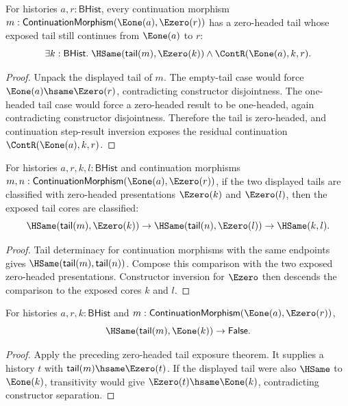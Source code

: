 \begin{theorem}
\label{thm:category-continuation-morphism-e1-source-e0-target-tail-cases}
For histories $a,r:\mathsf{BHist}$, every continuation morphism
$m:\mathsf{ContinuationMorphism}(\Eone(a),\Ezero(r))$ has a zero-headed tail
whose exposed tail still continues from $\Eone(a)$ to $r$:
$$
\exists k:\mathsf{BHist}.\;
\HSame(\mathsf{tail}(m),\Ezero(k))\land \ContR(\Eone(a),k,r).
$$
\end{theorem}
\begin{proof}
Unpack the displayed tail of $m$. The empty-tail case would force
$\Eone(a)\hsame\Ezero(r)$, contradicting constructor disjointness. The
one-headed tail case would force a zero-headed result to be one-headed, again
contradicting constructor disjointness. Therefore the tail is zero-headed, and
continuation step-result inversion exposes the residual continuation
$\ContR(\Eone(a),k,r)$.
\end{proof}

\begin{theorem}
\label{thm:continuation-morphism-e1-source-e0-target-tail-core-deterministic}
For histories $a,r,k,l:\mathsf{BHist}$ and continuation morphisms
$m,n:\mathsf{ContinuationMorphism}(\Eone(a),\Ezero(r))$, if the two displayed
tails are classified with zero-headed presentations
$\Ezero(k)$ and $\Ezero(l)$, then the exposed tail cores are classified:
$$
\HSame(\mathsf{tail}(m),\Ezero(k))\to
\HSame(\mathsf{tail}(n),\Ezero(l))\to
\HSame(k,l).
$$
\end{theorem}
\begin{proof}
Tail determinacy for continuation morphisms with the same endpoints gives
$\HSame(\mathsf{tail}(m),\mathsf{tail}(n))$. Compose this comparison with the
two exposed zero-headed presentations. Constructor inversion for $\Ezero$
then descends the comparison to the exposed cores $k$ and $l$.
\end{proof}

\begin{theorem}
\label{thm:category-continuation-e1-source-e0-target-tail-e1-absurd}
For histories $a,r,k:\mathsf{BHist}$ and
$m:\mathsf{ContinuationMorphism}(\Eone(a),\Ezero(r))$,
$$
\HSame(\mathsf{tail}(m),\Eone(k))\to\mathsf{False}.
$$
\end{theorem}
\begin{proof}
Apply the preceding zero-headed tail exposure theorem. It supplies a history
$t$ with $\mathsf{tail}(m)\hsame\Ezero(t)$. If the displayed tail were also
$\HSame$ to $\Eone(k)$, transitivity would give
$\Ezero(t)\hsame\Eone(k)$, contradicting constructor separation.
\end{proof}

